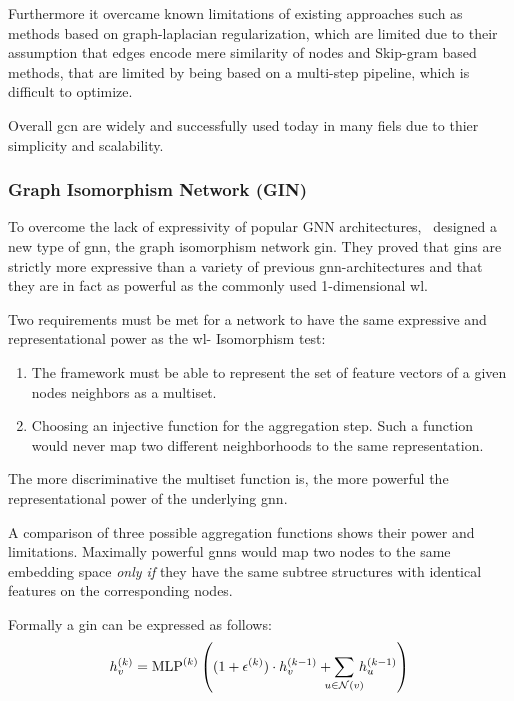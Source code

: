 Furthermore it overcame known limitations of existing approaches such as methods based on
graph-laplacian regularization, which are limited due to their assumption that edges encode mere similarity of nodes and Skip-gram based methods, that are limited by being based on a multi-step pipeline, which is difficult to optimize.

Overall \acf{gcn} are widely and successfully used today in many fiels due to thier simplicity and scalability.

\subsubsection{Graph Isomorphism Network (GIN)}
\label{sec:related:architectures:gin}
To overcome the lack of expressivity of popular GNN architectures,~\cite{Xu2019} designed a new type of \ac{gnn}, the graph isomorphism network \ac{gin}. They proved that \acp{gin} are strictly
more expressive than a variety of previous \ac{gnn}-architectures and that they are in fact as powerful as the commonly used 1-dimensional \acf{wl}.

Two requirements must be met for a network to have the same expressive and representational
power as the \ac{wl}- Isomorphism test:
\begin{enumerate}
    \item The framework must be able to represent the set of feature vectors of a given nodes
          neighbors as a multiset.
    \item Choosing an injective function for the aggregation step. Such a function would never
          map two different neighborhoods to the same representation.
\end{enumerate}
The more discriminative the multiset function is, the more powerful the representational power of the underlying \ac{gnn}.



A comparison of three possible aggregation functions shows their power and limitations.
Maximally powerful \acp{gnn} would map two nodes to the same embedding space \textit{only if} they have the same subtree structures with identical features on the corresponding nodes.



Formally a \acf{gin} can be expressed as follows:
\begin{align*}
    h^{(k)}_{v}  = \mathrm{MLP}^{(k)} \left((1 + \epsilon^{(k)}) \cdot h^{(k-1)}_{v} + \smashoperator{\sum_{{u} \in{\mathcal{N}(v)}}} \,h^{(k-1)}_{u}\right) \\
\end{align*}

